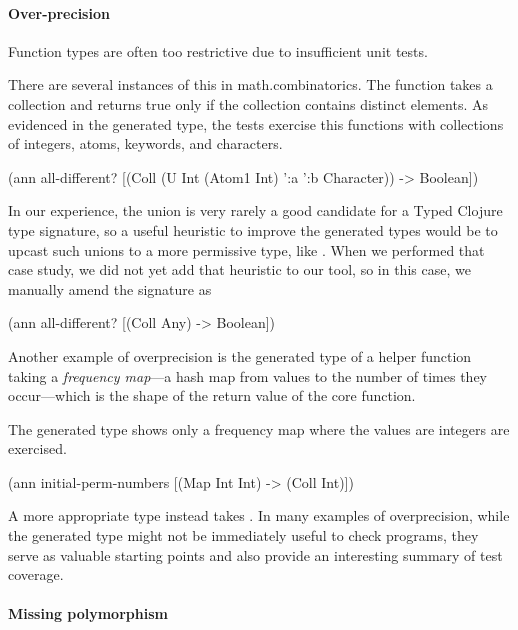 \paragraph{Over-precision}
Function types are often too restrictive due to
insufficient unit tests.

There are several instances of this in math.combinatorics.
The  function
takes a collection and returns true only if the collection
contains distinct elements.
As evidenced in the generated type, the tests exercise
this functions with collections of integers, atoms,
keywords, and characters.

\begin{cljlisting}
(ann all-different?
  [(Coll (U Int (Atom1 Int) ':a ':b Character)) 
   -> Boolean])
\end{cljlisting}

In our experience, the union is very rarely a good candidate
for a Typed Clojure type signature, so a useful heuristic to improve
the generated types would be to upcast such unions to a more permissive
type, like .
When we performed that case study, we did not yet add that heuristic
to our tool,
so in this case, we manually amend the signature as

\begin{cljlisting}
(ann all-different? [(Coll Any) -> Boolean])
\end{cljlisting}

Another example of overprecision is the generated type
of  a helper function
taking a \emph{frequency map}---a hash map from values
to the number of times they occur---which is the shape
of the return value of the core 
function.

The generated type shows only a frequency map where
the values are integers are exercised.
%
\begin{cljlisting}
(ann initial-perm-numbers
  [(Map Int Int) -> (Coll Int)])
\end{cljlisting}
%
A more appropriate type instead takes .
%
%
In many examples of overprecision, while the generated
type might not be immediately useful to check programs,
they serve as valuable starting points and also provide
an interesting summary of test coverage.

\paragraph{Missing polymorphism}

